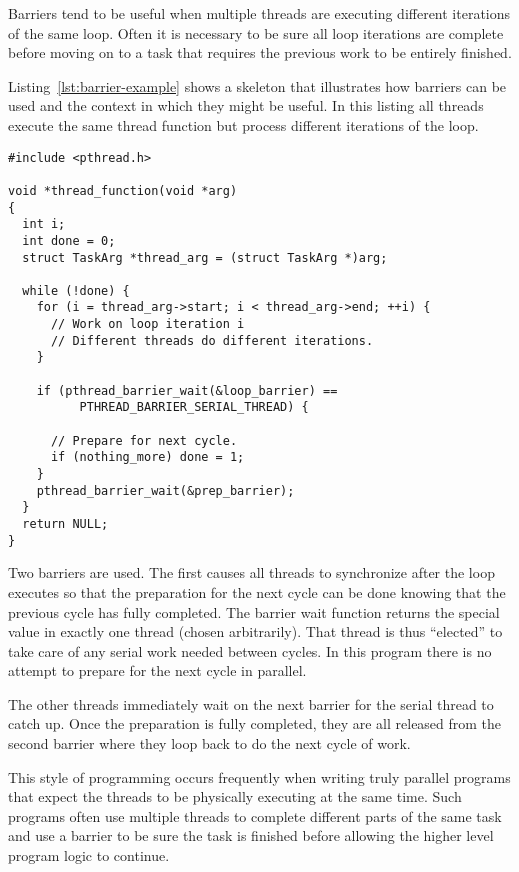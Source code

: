 Barriers tend to be useful when multiple threads are executing different iterations of the same
loop. Often it is necessary to be sure all loop iterations are complete before moving on to a
task that requires the previous work to be entirely finished.

Listing~\ref{lst:barrier-example} shows a skeleton that illustrates how barriers can be used and
the context in which they might be useful. In this listing all threads execute the same thread
function but process different iterations of the  loop.

\begin{lstlisting}[float=tp,frame=single,xleftmargin=0in, caption={Barrier
Example},label=lst:barrier-example]
#include <pthread.h>

void *thread_function(void *arg)
{
  int i;
  int done = 0;
  struct TaskArg *thread_arg = (struct TaskArg *)arg;

  while (!done) {
    for (i = thread_arg->start; i < thread_arg->end; ++i) {
      // Work on loop iteration i
      // Different threads do different iterations.
    }

    if (pthread_barrier_wait(&loop_barrier) ==
          PTHREAD_BARRIER_SERIAL_THREAD) {

      // Prepare for next cycle.
      if (nothing_more) done = 1;
    }
    pthread_barrier_wait(&prep_barrier);
  }
  return NULL;
}
\end{lstlisting}

Two barriers are used. The first causes all threads to synchronize after the  loop
executes so that the preparation for the next cycle can be done knowing that the previous cycle
has fully completed. The barrier wait function returns the special value
 in exactly one thread (chosen arbitrarily).
That thread is thus ``elected'' to take care of any serial work needed between cycles. In this
program there is no attempt to prepare for the next cycle in parallel.

The other threads immediately wait on the next barrier for the serial thread to catch up. Once
the preparation is fully completed, they are all released from the second barrier where they
loop back to do the next cycle of work.

This style of programming occurs frequently when writing truly parallel programs that expect
the threads to be physically executing at the same time. Such programs often use multiple
threads to complete different parts of the same task and use a barrier to be sure the task is
finished before allowing the higher level program logic to continue.

